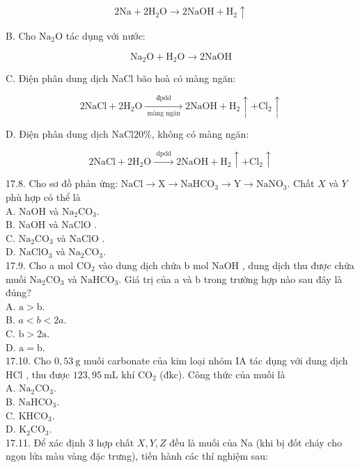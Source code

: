 \documentclass[10pt]{article}
\begin{document}
$$
2 \mathrm{Na}+2 \mathrm{H}_{2} \mathrm{O} \rightarrow 2 \mathrm{NaOH}+\mathrm{H}_{2} \uparrow
$$

B. Cho $\mathrm{Na}_{2} \mathrm{O}$ tác dụng với nước:

$$
\mathrm{Na}_{2} \mathrm{O}+\mathrm{H}_{2} \mathrm{O} \rightarrow 2 \mathrm{NaOH}
$$

C. Điện phân dung dịch NaCl bão hoà có màng ngăn:

$$
2 \mathrm{NaCl}+2 \mathrm{H}_{2} \mathrm{O} \xrightarrow[\text { màng ngăn }]{\text { đpdd }} 2 \mathrm{NaOH}+\mathrm{H}_{2} \uparrow+\mathrm{Cl}_{2} \uparrow
$$

D. Điện phân dung dịch $\mathrm{NaCl} 20 \%$, không có màng ngăn:

$$
2 \mathrm{NaCl}+2 \mathrm{H}_{2} \mathrm{O} \xrightarrow{\text { dpdd }} 2 \mathrm{NaOH}+\mathrm{H}_{2} \uparrow+\mathrm{Cl}_{2} \uparrow
$$

17.8. Cho sơ đồ phản ứng: $\mathrm{NaCl} \rightarrow \mathrm{X} \rightarrow \mathrm{NaHCO}_{3} \rightarrow \mathrm{Y} \rightarrow \mathrm{NaNO}_{3}$. Chất $X$ và $Y$ phù hợp có thể là\\
A. NaOH và $\mathrm{Na}_{2} \mathrm{CO}_{3}$.\\
B. NaOH và NaClO .\\
C. $\mathrm{Na}_{2} \mathrm{CO}_{3}$ và NaClO .\\
D. $\mathrm{NaClO}_{3}$ và $\mathrm{Na}_{2} \mathrm{CO}_{3}$.\\
17.9. Cho a mol $\mathrm{CO}_{2}$ vào dung dịch chứa b mol NaOH , dung dịch thu được chứa muối $\mathrm{Na}_{2} \mathrm{CO}_{3}$ và $\mathrm{NaHCO}_{3}$. Giá trị của a và b trong trường hợp nào sau đây là đúng?\\
A. $\mathrm{a}>\mathrm{b}$.\\
B. $a<b<2 a$.\\
C. $\mathrm{b}>2 \mathrm{a}$.\\
D. $\mathrm{a}=\mathrm{b}$.\\
17.10. Cho $0,53 \mathrm{~g}$ muối carbonate của kim loại nhóm IA tác dụng với dung dịch HCl , thu được $123,95 \mathrm{~mL}$ khí $\mathrm{CO}_{2}$ (đkc). Công thức của muối là\\
A. $\mathrm{Na}_{2} \mathrm{CO}_{3}$.\\
B. $\mathrm{NaHCO}_{3}$.\\
C. $\mathrm{KHCO}_{3}$.\\
D. $\mathrm{K}_{2} \mathrm{CO}_{3}$.\\
17.11. Để xác định 3 hợp chất $X, Y, Z$ đều là muối của Na (khi bị đốt cháy cho ngọn lửa màu vàng đặc trưng), tiến hành các thí nghiệm sau:
\end{document}

